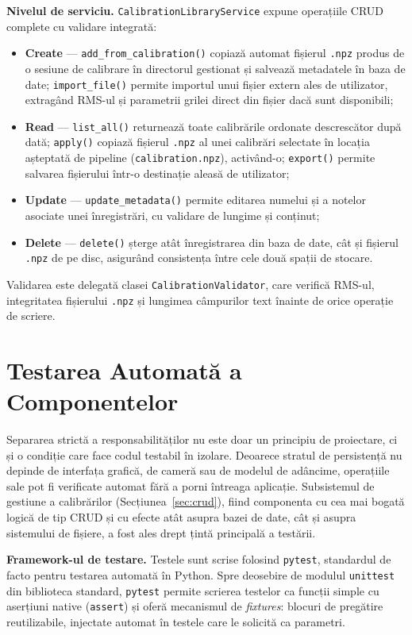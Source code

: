 \textbf{Nivelul de serviciu.} \texttt{CalibrationLibraryService} expune operațiile CRUD complete cu validare integrată:
\begin{itemize}
    \item \textbf{Create} — \texttt{add\_from\_calibration()} copiază automat fișierul \texttt{.npz} produs de o sesiune de calibrare în directorul gestionat și salvează metadatele în baza de date; \texttt{import\_file()} permite importul unui fișier extern ales de utilizator, extragând RMS-ul și parametrii grilei direct din fișier dacă sunt disponibili;
    \item \textbf{Read} — \texttt{list\_all()} returnează toate calibrările ordonate descrescător după dată; \texttt{apply()} copiază fișierul \texttt{.npz} al unei calibrări selectate în locația așteptată de pipeline (\texttt{calibration.npz}), activând-o; \texttt{export()} permite salvarea fișierului într-o destinație aleasă de utilizator;
    \item \textbf{Update} — \texttt{update\_metadata()} permite editarea numelui și a notelor asociate unei înregistrări, cu validare de lungime și conținut;
    \item \textbf{Delete} — \texttt{delete()} șterge atât înregistrarea din baza de date, cât și fișierul \texttt{.npz} de pe disc, asigurând consistența între cele două spații de stocare.
\end{itemize}

Validarea este delegată clasei \texttt{CalibrationValidator}, care verifică RMS-ul, integritatea fișierului \texttt{.npz} și lungimea câmpurilor text înainte de orice operație de scriere.

\section{Testarea Automată a Componentelor}
\label{sec:testing}

Separarea strictă a responsabilităților nu este doar un principiu de proiectare, ci și o condiție care face codul testabil în izolare. Deoarece stratul de persistență nu depinde de interfața grafică, de cameră sau de modelul de adâncime, operațiile sale pot fi verificate automat fără a porni întreaga aplicație. Subsistemul de gestiune a calibrărilor (Secțiunea~\ref{sec:crud}), fiind componenta cu cea mai bogată logică de tip CRUD și cu efecte atât asupra bazei de date, cât și asupra sistemului de fișiere, a fost ales drept țintă principală a testării.

\textbf{Framework-ul de testare.} Testele sunt scrise folosind \texttt{pytest}, standardul de facto pentru testarea automată în Python. Spre deosebire de modulul \texttt{unittest} din biblioteca standard, \texttt{pytest} permite scrierea testelor ca funcții simple cu aserțiuni native (\texttt{assert}) și oferă mecanismul de \textit{fixtures}: blocuri de pregătire reutilizabile, injectate automat în testele care le solicită ca parametri.

